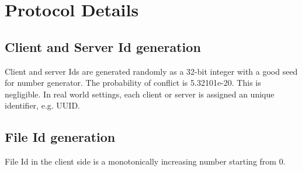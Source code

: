 \documentclass[12pt,fleqn]{article}
\begin{document}
\section{Protocol Details}

\subsection{Client and Server Id generation}
Client and server Ids are generated randomly as a 32-bit integer with a good seed for number generator. The probability of conflict is 5.32101e-20. This is negligible. In real world settings, each client or server is assigned an unique identifier, e.g. UUID.

\subsection{File Id generation}
File Id in the client side is a monotonically increasing number starting from 0.
\end{document}
